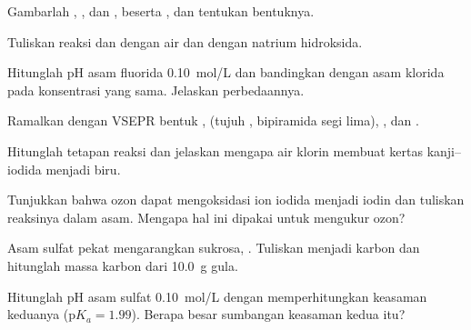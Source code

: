 \begin{exercise}[$\star$]\label{exo:b1:p-block-16-18:3}
Gambarlah  , , dan , beserta , dan tentukan bentuknya.
\end{exercise}

\begin{exercise}[$\star$]\label{exo:b1:p-block-16-18:4}
Tuliskan reaksi  dan  dengan air dan dengan natrium
hidroksida.
\end{exercise}

\begin{exercise}[$\star\star$]\label{exo:b1:p-block-16-18:5}
Hitunglah pH asam fluorida \qty{0.10}{mol/L} dan bandingkan dengan asam
klorida pada konsentrasi yang sama. Jelaskan perbedaannya.
\end{exercise}

\begin{exercise}[$\star\star$]\label{exo:b1:p-block-16-18:6}
Ramalkan dengan VSEPR bentuk ,  (tujuh ,
bipiramida segi lima), , dan .
\end{exercise}

\begin{exercise}[$\star\star$]\label{exo:b1:p-block-16-18:7}
Hitunglah tetapan reaksi  dan jelaskan mengapa
air klorin membuat kertas kanji--iodida menjadi biru.
\end{exercise}

\begin{exercise}[$\star\star$]\label{exo:b1:p-block-16-18:8}
Tunjukkan bahwa ozon dapat mengoksidasi ion iodida menjadi iodin dan
tuliskan reaksinya dalam asam. Mengapa hal ini dipakai untuk mengukur ozon?
\end{exercise}

\begin{exercise}[$\star\star$]\label{exo:b1:p-block-16-18:9}
Asam sulfat pekat mengarangkan sukrosa, . Tuliskan
 menjadi karbon dan hitunglah massa karbon dari \qty{10.0}{g}
gula.
\end{exercise}

\begin{exercise}[$\star\star\star$]\label{exo:b1:p-block-16-18:10}
Hitunglah pH asam sulfat \qty{0.10}{mol/L} dengan memperhitungkan
keasaman keduanya ($\mathrm{p}K_a = 1.99$). Berapa besar sumbangan
keasaman kedua itu?
\end{exercise}

